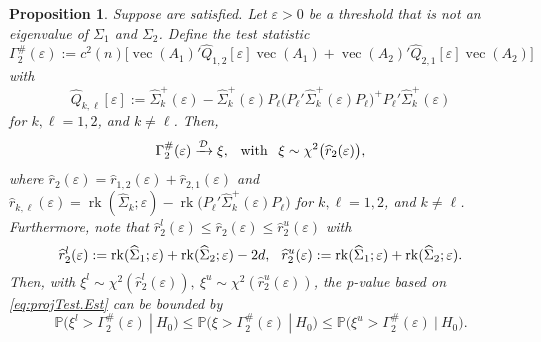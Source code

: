 \documentclass[12pt]{article}
\numberwithin{equation}{section}
\numberwithin{table}{section}
\numberwithin{thm}{section}
\numberwithin{defn}{section}
\numberwithin{lem}{section}
\newtheorem{prop}{Proposition}
\numberwithin{prop}{section}
\numberwithin{cor}{section}
\numberwithin{rem}{section}
\DeclareMathOperator{\Vector}{vec}
\newcommand{\rank}{\operatorname{rk}}
\begin{document}
\begin{appendix}

\begin{prop}\label{thm:LLRest}
Suppose  are satisfied. Let $\varepsilon > 0$ be a threshold that is not an eigenvalue of $\Sigma_1$ and $\Sigma_2$. Define the test statistic
\begin{equation}\label{eqn:gamma1.Est}
    \Gamma_2^\#(\varepsilon) := c^2(n) \Big[\Vector (A_1)' \widehat{Q}_{1,2}[\varepsilon] \Vector(A_1) + \Vector(A_2)' \widehat{Q}_{2,1}[\varepsilon] \Vector(A_2)\Big]
\end{equation}
with
\begin{equation} \label{eq:Qkl}
\widehat{Q}_{k,\ell}[\varepsilon] := \widehat{\Sigma}_k^+(\varepsilon) - \widehat{\Sigma}_k^+(\varepsilon) P_\ell \big(P_\ell' \widehat{\Sigma}_k^+(\varepsilon) P_\ell\big)^+ P_\ell' \widehat{\Sigma}_k^+(\varepsilon)
\end{equation}
for $k, \ell = 1, 2$, and $k \neq \ell$. Then,
\begin{equation}\label{eq:projTest.Est}
    \Gamma_2^\#(\varepsilon) \xrightarrow{\mathcal{D}} \xi, \hspace{0.15cm} \text{ with } \hspace{0.15cm} \xi \sim \chi^2\big(\widehat{r}_2(\varepsilon)\big),
\end{equation}
where $\widehat{r}_2(\varepsilon) = \widehat{r}_{1,2}(\varepsilon) + \widehat{r}_{2,1}(\varepsilon)$ and $\widehat{r}_{k,\ell}(\varepsilon) = \rank(\widehat{\Sigma}_k; \varepsilon) - \rank\big( P_{\ell}' \widehat{\Sigma}_k^+(\varepsilon) P_{\ell} \big)$ for $k, \ell = 1,2$, and $k \neq \ell$. Furthermore, note that $\widehat{r}_2^l(\varepsilon) \leq \widehat{r}_2(\varepsilon) \leq \widehat{r}_2^u(\varepsilon)$ with
$$
\widehat{r}_2^l(\varepsilon) := \rank(\widehat{\Sigma}_1; \varepsilon) + \rank(\widehat{\Sigma}_2; \varepsilon) - 2d, \hspace{0.25cm} \widehat{r}_2^u(\varepsilon) := \rank(\widehat{\Sigma}_1; \varepsilon) + \rank(\widehat{\Sigma}_2; \varepsilon).
$$
Then, with $\xi^l \sim \chi^2(\widehat{r}^l_2(\varepsilon)), ~ \xi^u \sim \chi^2(\widehat{r}^u_2(\varepsilon))$, the p-value based on \eqref{eq:projTest.Est} can be bounded by
\begin{equation}\label{eq:upperBound}
    \mathbb{P} \big( \xi^l > \Gamma_2^\#(\varepsilon) ~|~ H_0\big) \leq \mathbb{P} \big( \xi > \Gamma_2^\#(\varepsilon) ~|~ H_0\big) \leq \mathbb{P} \big( \xi^u > \Gamma_2^\#(\varepsilon) ~|~ H_0\big).
\end{equation}
\end{prop}


\end{appendix}
\end{document}
